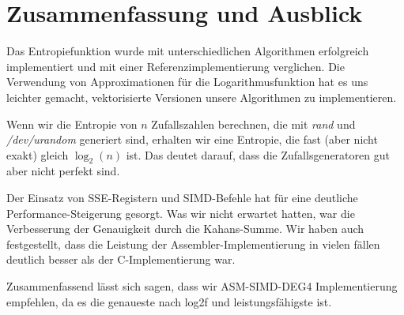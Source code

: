 \section{Zusammenfassung und Ausblick}
Das Entropiefunktion wurde mit unterschiedlichen Algorithmen erfolgreich implementiert und mit einer Referenzimplementierung verglichen. Die Verwendung von Approximationen für die Logarithmusfunktion hat es uns leichter gemacht, vektorisierte Versionen unsere Algorithmen zu implementieren.

Wenn wir die Entropie von $n$ Zufallszahlen berechnen, die mit \emph{rand} und \emph{/dev/urandom} generiert sind, erhalten wir eine Entropie, die fast (aber nicht exakt) gleich $\log_2(n)$ ist. Das deutet darauf, dass die Zufallsgeneratoren gut aber nicht perfekt sind.

Der Einsatz von SSE-Registern und SIMD-Befehle hat für eine deutliche Performance-Steigerung gesorgt.  Was wir nicht erwartet hatten, war die Verbesserung der Genauigkeit durch die Kahans-Summe. Wir haben auch festgestellt, dass die Leistung der Assembler-Implementierung in vielen fällen deutlich besser als der C-Implementierung war.

Zusammenfassend lässt sich sagen, dass wir ASM-SIMD-DEG4 Implementierung empfehlen, da es die genaueste nach log2f und leistungsfähigste ist.

\newpage